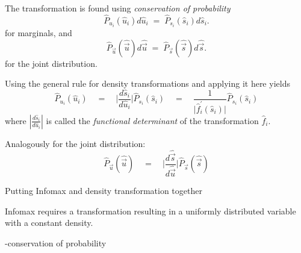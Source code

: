 \begin{frame}{\subsubsecname}


The transformation is found using \emph{conservation of probability}
\begin{equation}
	\widehat{P}_{u_i}(\widehat{u}_i) d \widehat{u}_i 
	\; =  \; \widehat{P}_{s_i} (\widehat{s}_i) d \widehat{s}_i.
\end{equation}
for marginals, and
\begin{equation}
	\widehat{P}_{\vec u}(\widehat{\vec u}) d \widehat{\vec u} 
	\; =  \; \widehat{P}_{\vec s} (\widehat{\vec s}) d \widehat{\vec s}.
\end{equation}
for the joint distribution.


Using the general rule for density transformations and applying it here yields
\begin{equation}
\label{eq:conservation1}
	\widehat{P}_{u_i}(\widehat{u}_i) \quad
	 =  \quad \bigg| 
		\frac{d \widehat{s}_i}{d \widehat{u}_i} \bigg| 
			 \widehat{P}_{s_i}(\widehat{s}_i) \quad
	 =  \quad \frac{1}{\big| \widehat{f}_i^{'} (\widehat{s}_i) \big|} 
		\widehat{P}_{s_i}(\widehat{s}_i)
\end{equation}
where $\left|\frac{d \widehat{s}_i}{d \widehat{u}_i} \right|$ is
called the \emph{functional determinant} of the transformation
$\widehat{f}_i$.

Analogously for the joint distribution:
\begin{equation}
\label{eq:conservation1joint}
	\widehat{P}_{\vec u}(\widehat{\vec u}) \quad
	 =  \quad \bigg| 
		\frac{d \widehat{\vec s}}{d \widehat{\vec u}} \bigg| 
			 \widehat{P}_{\vec s}(\widehat{\vec s})
\end{equation}

\end{frame}

\begin{frame}{Putting Infomax and density transformation together}



\pause

Infomax requires a transformation resulting in a uniformly distributed
variable with a constant density.



\pause

-conservation of probability

\end{frame}

